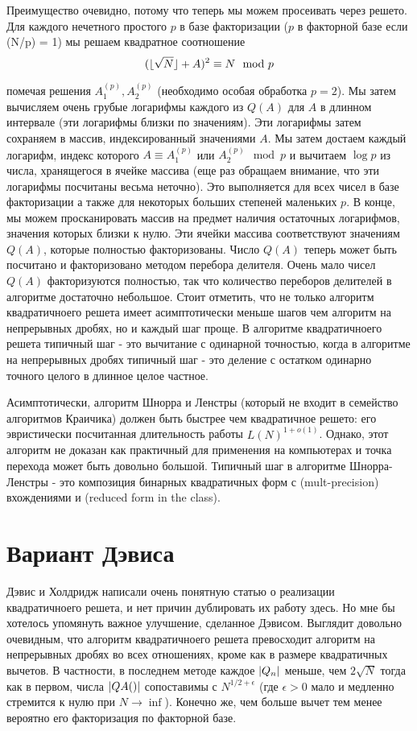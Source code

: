 \documentclass[a4paper,12pt]{report}
\DeclarePairedDelimiter\floor{\lfloor}{\rfloor}
\DeclarePairedDelimiter\abs{\lvert}{\rvert}%
\begin{document}
Преимущество очевидно, потому что теперь мы можем просеивать через решето. Для каждого нечетного простого $p$ в базе факторизации ($p$ в факторной базе если (N/p) = 1) мы решаем квадратное соотношение
\begin{equation*}
(\floor{\sqrt{N}} +A)^2 \equiv N \mod p
\end{equation*}

помечая решения $A_{1}^{(p)}, A_{2}^{(p)}$ (необходимо особая обработка $p = 2$). Мы затем вычисляем очень грубые логарифмы каждого из $Q(A)$ для $A$ в длинном интервале (эти логарифмы близки по значениям). Эти логарифмы затем сохраняем в массив, индексированный значениями $A$. Мы затем достаем каждый логарифм, индекс которого $A \equiv A_{1}^{(p)}$ или $A_{2}^{(p)} \mod p$ и вычитаем $\log{p}$ из числа, хранящегося в ячейке массива (еще раз обращаем внимание, что эти логарифмы посчитаны весьма неточно). Это выполняется для всех чисел в базе факторизации а также для некоторых больших степеней маленьких $p$. В конце, мы можем просканировать массив на предмет наличия остаточных логарифмов, значения которых близки к нулю. Эти ячейки массива соответствуют значениям $Q(A)$, которые полностью факторизованы. Число $Q(A)$ теперь может быть посчитано и факторизовано методом перебора делителя. Очень мало чисел $Q(A)$ факторизуются полностью, так что количество переборов делителей в алгоритме достаточно небольшое. Стоит отметить, что не только алгоритм квадратичноего решета имеет асимптотически меньше шагов чем алгоритм на непрерывных дробях, но и каждый шаг проще. В алгоритме квадратичноего решета типичный шаг - это вычитание с одинарной точностью, когда в алгоритме на непрерывных дробях типичный шаг - это деление с остатком одинарно точного целого в длинное целое частное.

Асимптотически, алгоритм Шнорра и Ленстры \cite{shnor} (который не входит в семейство алгоритмов Краичика) должен быть быстрее чем квадратичное решето: его эвристически посчитанная длительность работы $L(N)^{1 + o(1)}$. Однако, этот алгоритм не доказан как практичный для применения на компьютерах и точка перехода может быть довольно большой. Типичный шаг в алгоритме Шнорра-Ленстры - это композиция бинарных квадратичных форм с (mult-precision) вхождениями и (reduced form in the class).

\section{Вариант Дэвиса}
Дэвис и Холдридж \cite{sand} написали очень понятную статью о реализации квадратичноего решета, и нет причин дублировать их работу здесь. Но мне бы хотелось упомянуть важное улучшение, сделанное Дэвисом. Выглядит довольно очевидным, что алгоритм квадратичноего решета превосходит алгоритм на непрерывных дробях во всех отношениях, кроме как в размере квадратичных вычетов. В частности, в последнем методе каждое $\abs{Q_n}$ меньше, чем $2\sqrt{N}$ тогда как в первом, числа $\abs{QA()}$ сопоставимы с $N^{1/2 + \epsilon}$ (где $\epsilon > 0$ мало и медленно стремится к нулю при $N \to \inf$). Конечно же, чем больше вычет тем менее вероятно его факторизация по факторной базе.
\end{document}
